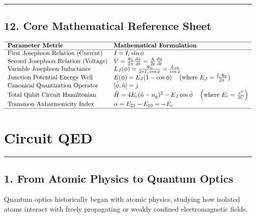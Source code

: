 \documentclass[
]{article}
\begin{document}
\begin{center}\rule{0.5\linewidth}{0.5pt}\end{center}

\subsection{12. Core Mathematical Reference
Sheet}\label{core-mathematical-reference-sheet}

\[\begin{array}{ll}
\hline
\textbf{Parameter Metric} & \textbf{Mathematical Formulation} \\ \hline
\text{First Josephson Relation (Current)} & I = I_c \sin \phi \\
\text{Second Josephson Relation (Voltage)} & V = \frac{\Phi_0}{2\pi} \frac{d\phi}{dt} = \frac{\hbar}{2e} \frac{d\phi}{dt} \\
\text{Variable Josephson Inductance} & L_J(\phi) = \frac{\Phi_0}{2\pi I_c \cos \phi} = \frac{L_{J0}}{\cos \phi} \\
\text{Junction Potential Energy Well} & E(\phi) = E_J(1 - \cos \phi) \quad \left(\text{where } E_J = \frac{I_c \Phi_0}{2\pi}\right) \\
\text{Canonical Quantization Operator} & [\hat{\phi}, \hat{n}] = j \\
\text{Total Qubit Circuit Hamiltonian} & \hat{H} = 4E_c(\hat{n} - n_g)^2 - E_J \cos \hat{\phi} \quad \left(\text{where } E_c = \frac{e^2}{2C}\right) \\
\text{Transmon Anharmonicity Index} & \alpha = E_{21} - E_{10} = -E_c \\ \hline
\end{array}\]

\section{Circuit QED}\label{circuit-qed}

\begin{center}\rule{0.5\linewidth}{0.5pt}\end{center}

\subsection{1. From Atomic Physics to Quantum
Optics}\label{from-atomic-physics-to-quantum-optics}

Quantum optics historically began with atomic physics, studying how
isolated atoms interact with freely propagating or weakly confined
electromagnetic fields.
\end{document}

